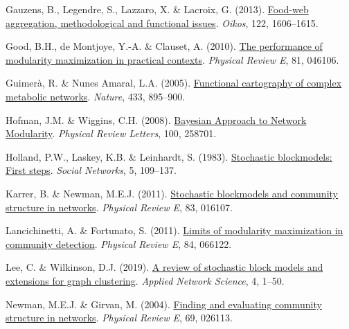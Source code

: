 \documentclass[
]{article}
\newlength{\cslhangindent}
\newlength{\cslentryspacingunit} %
\newenvironment{CSLReferences}[2] %
 {%
  \setlength{\parindent}{0pt}
  \ifodd #1
  \let\oldpar\par
  \def\par{\hangindent=\cslhangindent\oldpar}
  \fi
  \setlength{\parskip}{#2\cslentryspacingunit}
 }%
 {}
\begin{document}
\begin{CSLReferences}{1}{0}
\leavevmode{}%
Gauzens, B., Legendre, S., Lazzaro, X. \& Lacroix, G. (2013).
\href{https://www.jstor.org/stable/24567396}{Food-web aggregation,
methodological and functional issues}. \emph{Oikos}, 122, 1606--1615.

\leavevmode{}%
Good, B.H., de Montjoye, Y.-A. \& Clauset, A. (2010).
\href{https://doi.org/10.1103/PhysRevE.81.046106}{The performance of
modularity maximization in practical contexts}. \emph{Physical Review
E}, 81, 046106.

\leavevmode{}%
Guimerà, R. \& Nunes Amaral, L.A. (2005).
\href{https://doi.org/10.1038/nature03288}{Functional cartography of
complex metabolic networks}. \emph{Nature}, 433, 895--900.

\leavevmode{}%
Hofman, J.M. \& Wiggins, C.H. (2008).
\href{https://doi.org/10.1103/PhysRevLett.100.258701}{Bayesian
{Approach} to {Network Modularity}}. \emph{Physical Review Letters},
100, 258701.

\leavevmode{}%
Holland, P.W., Laskey, K.B. \& Leinhardt, S. (1983).
\href{https://doi.org/10.1016/0378-8733(83)90021-7}{Stochastic
blockmodels: {First} steps}. \emph{Social Networks}, 5, 109--137.

\leavevmode{}%
Karrer, B. \& Newman, M.E.J. (2011).
\href{https://doi.org/10.1103/PhysRevE.83.016107}{Stochastic blockmodels
and community structure in networks}. \emph{Physical Review E}, 83,
016107.

\leavevmode{}%
Lancichinetti, A. \& Fortunato, S. (2011).
\href{https://doi.org/10.1103/PhysRevE.84.066122}{Limits of modularity
maximization in community detection}. \emph{Physical Review E}, 84,
066122.

\leavevmode{}%
Lee, C. \& Wilkinson, D.J. (2019).
\href{https://doi.org/10.1007/s41109-019-0232-2}{A review of stochastic
block models and extensions for graph clustering}. \emph{Applied Network
Science}, 4, 1--50.

\leavevmode{}%
Newman, M.E.J. \& Girvan, M. (2004).
\href{https://doi.org/10.1103/PhysRevE.69.026113}{Finding and evaluating
community structure in networks}. \emph{Physical Review E}, 69, 026113.


\end{CSLReferences}
\end{document}
